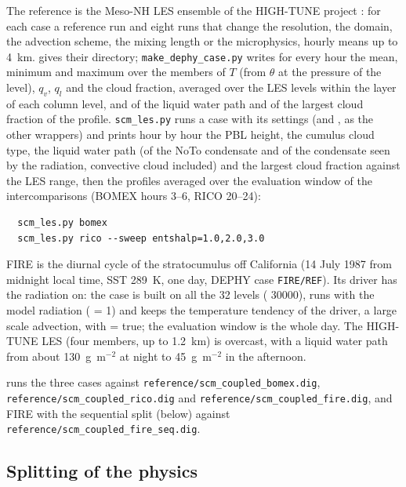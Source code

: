 The reference is the Meso-NH LES ensemble of the HIGH-TUNE project
\citep{couvreux2021}: for each case a reference run and eight runs that
change the resolution, the domain, the advection scheme, the mixing
length or the microphysics, hourly means up to 4~km.  gives
their directory; \verb=make_dephy_case.py= writes for every hour the
mean, minimum and maximum over the members of $T$ (from $\theta$ at the
pressure of the level), $q_v$, $q_l$ and the cloud fraction, averaged
over the LES levels within the layer of each column level, and of the
liquid water path and of the largest cloud fraction of the profile.
\verb=scm_les.py= runs a case with its settings (and ,
 as the other wrappers) and prints hour by hour the PBL
height, the cumulus cloud type, the liquid water path (of the NoTo
condensate and of the condensate seen by the radiation, convective cloud
included) and the largest cloud fraction against the LES range, then the
profiles averaged over the evaluation window of the intercomparisons
(BOMEX hours 3--6, RICO 20--24):
\begin{verbatim}
  scm_les.py bomex
  scm_les.py rico --sweep entshalp=1.0,2.0,3.0
\end{verbatim}
FIRE \citep{duynkerke2004} is the diurnal cycle of the stratocumulus off
California (14 July 1987 from midnight local time, SST 289~K, one day,
DEPHY case \verb=FIRE/REF=). Its driver has the radiation on: the case is
built on all the 32 levels ( 30000), runs with the model
radiation ( = 1) and keeps the temperature tendency of the
driver, a large scale advection, with  = true; the
evaluation window is the whole day. The HIGH-TUNE LES (four members, up
to 1.2~km) is overcast, with a liquid water path from about 130~g~m$^{-2}$
at night to 45~g~m$^{-2}$ in the afternoon.

 runs the three cases against
\verb=reference/scm_coupled_bomex.dig=,
\verb=reference/scm_coupled_rico.dig= and
\verb=reference/scm_coupled_fire.dig=, and FIRE with the sequential
split (below) against \verb=reference/scm_coupled_fire_seq.dig=.

\subsection{Splitting of the physics}

